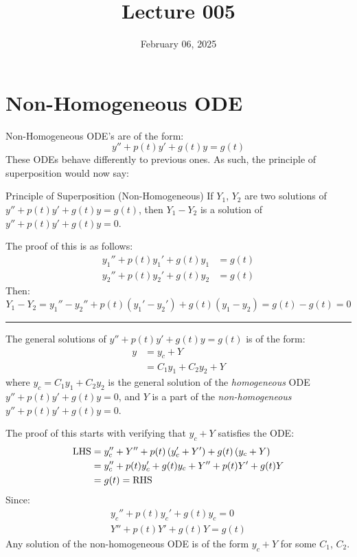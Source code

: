 \documentclass[12pt]{article}
\title{Lecture 005}
\date{February 06, 2025}
\begin{document}
\section{Non-Homogeneous ODE}
\label{sec:nonHomogeneousODE}

Non-Homogeneous ODE's are of the form:
\begin{equation*}
  y'' + p(t)y' + g(t)y = g(t)
\end{equation*}
These ODEs behave differently to previous ones. As such, the principle of superposition would now say:

\begin{definition}{Principle of Superposition (Non-Homogeneous)}
  If $Y_1$, $Y_2$ are two solutions of $y'' + p(t)y' + g(t)y = g(t)$, then $Y_1-Y_2$ is a solution of $y'' + p(t)y' + g(t)y = 0$.
\end{definition}

The proof of this is as follows:
\begin{align*}
  y_1'' + p(t)y_1' + g(t)y_1 &= g(t) \\
  y_2'' + p(t)y_2' + g(t)y_2 &= g(t)
\end{align*}
Then:
\begin{equation*}
  Y_1 - Y_2 = y_1''-y_2'' + p(t)\left(y_1'-y_2'\right) + g(t)\left(y_1-y_2\right) = g(t)-g(t) = 0
\end{equation*}
\vspace{12pt}
\hrule
\vspace{12pt}
The general solutions of $y'' + p(t)y' + g(t)y = g(t)$ is of the form:
\begin{align*}
  y &= y_c + Y \\
    &= C_1y_1 + C_2y_2 + Y
\end{align*}
where $y_c = C_1y_1 + C_2y_2$ is the general solution of the \textit{homogeneous} ODE $y'' + p(t)y' + g(t)y = 0$, and $Y$ is a part of the \textit{non-homogeneous} $y'' + p(t)y' + g(t)y = 0$.

The proof of this starts with verifying that $y_c + Y$ satisfies the ODE:
\begin{align*}
  \textup{LHS} &= y_c'' + Y'' + p(t)\left(y_c' + Y'\right) + g(t)\left(y_c + Y\right) \\
               &= y_c'' + p(t)y_c' + g(t)y_c + Y'' + p(t)Y' + g(t)Y \\
               &= g(t) = \textup{RHS}
\end{align*}
Since:
\begin{gather*}
  y_c'' + p(t)y_c' + g(t)y_c = 0 \\
  Y'' + p(t)Y' + g(t)Y = g(t)
\end{gather*}
Any solution of the non-homogeneous ODE is of the form $y_c+Y$ for some $C_1$, $C_2$.
\end{document}
